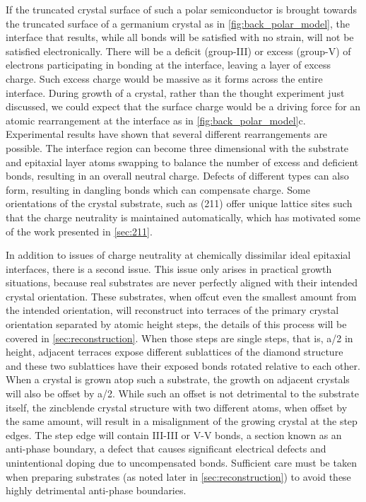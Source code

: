 If the truncated crystal surface of such a polar semiconductor is brought towards the truncated surface of a germanium crystal as in \cref{fig:back_polar_model}, the interface that results, while all bonds will be satisfied with no strain, will not be satisfied electronically.
There will be a deficit (group-III) or excess (group-V) of electrons participating in bonding at the interface, leaving a layer of excess charge.
Such excess charge would be massive as it forms across the entire interface.
During growth of a crystal, rather than the thought experiment just discussed, we could expect that the surface charge would be a driving force for an atomic rearrangement at the interface as in \cref{fig:back_polar_model}c.
Experimental results have shown that several different rearrangements are possible.
The interface region can become three dimensional with the substrate and epitaxial layer atoms swapping to balance the number of excess and deficient bonds, resulting in an overall neutral charge.
Defects of different types can also form, resulting in dangling bonds which can compensate charge.
Some orientations of the crystal substrate, such as (211) offer unique lattice sites such that the charge neutrality is maintained automatically, which has motivated some of the work presented in \cref{sec:211}.

In addition to issues of charge neutrality at chemically dissimilar ideal epitaxial interfaces, there is a second issue.
This issue only arises in practical growth situations, because real substrates are never perfectly aligned with their intended crystal orientation.
These substrates, when offcut even the smallest amount from the intended orientation, will reconstruct into terraces of the primary crystal orientation separated by atomic height steps, the details of this process will be covered in \cref{sec:reconstruction}.
When those steps are single steps, that is, a/2 in height, adjacent terraces expose different sublattices of the diamond structure and these two sublattices have their exposed bonds rotated relative to each other.
When a crystal is grown atop such a substrate, the growth on adjacent crystals will also be offset by a/2.
While such an offset is not detrimental to the substrate itself, the zincblende crystal structure with two different atoms, when offset by the same amount, will result in a misalignment of the growing crystal at the step edges.
The step edge will contain III-III or V-V bonds, a section known as an anti-phase boundary, a defect that causes significant electrical defects and unintentional doping due to uncompensated bonds.
Sufficient care must be taken when preparing substrates (as noted later in \cref{sec:reconstruction}) to avoid these highly detrimental anti-phase boundaries.

